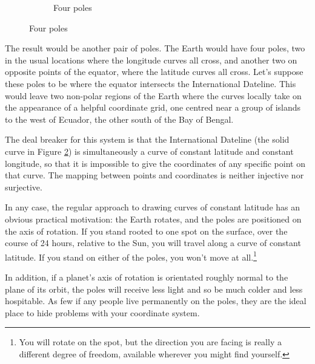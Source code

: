 \begin{figure}[h]
\begin{subfigure}{0.5\textwidth}
    \caption{Four poles} \label{fig:globe-terrible}
    \end{subfigure}
\end{figure}

The result would be another pair of poles. The Earth would have four poles, two in the usual locations where the longitude curves all cross, and another two on opposite points of the equator, where the latitude curves all cross. Let's suppose these poles to be where the equator intersects the International Dateline. This would leave two non-polar regions of the Earth where the curves locally take on the appearance of a helpful coordinate grid, one centred near a group of islands to the west of Ecuador, the other south of the Bay of Bengal.

The deal breaker for this system is that the International Dateline (the solid curve in Figure \ref{fig:globe-terrible}) is simultaneously a curve of constant latitude and constant longitude, so that it is impossible to give the coordinates of any specific point on that curve. The mapping between points and coordinates is neither injective nor surjective.

In any case, the regular approach to drawing curves of constant latitude has an obvious practical motivation: the Earth rotates, and the poles are positioned on the axis of rotation. If you stand rooted to one spot on the surface, over the course of 24 hours, relative to the Sun, you will travel along a curve of constant latitude. If you stand on either of the poles, you won't move at all.\footnote{You will rotate on the spot, but the direction you are facing is really a different degree of freedom, available wherever you might find yourself.}

In addition, if a planet's axis of rotation is orientated roughly normal to the plane of its orbit, the poles will receive less light and so be much colder and less hospitable. As few if any people live permanently on the poles, they are the ideal place to hide problems with your coordinate system.

